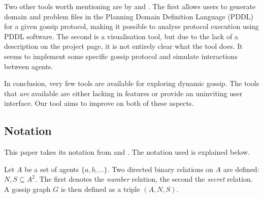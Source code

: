 Two other tools worth mentioning are by \textcite{maffre_faustinemaffregossipproblem-pddl-generator_2020} and \textcite{moelker_rrmoelkergossip-visualization_2016}.
The first allows users to generate domain and problem files in the Planning Domain Definition Language (PDDL) for a given gossip protocol, making it possible to analyse protocol execution using PDDL software.
The second is a visualisation tool, but due to the lack of a description on the project page, it is not entirely clear what the tool does. It seems to implement some specific gossip protocol and simulate interactions between agents.

In conclusion, very few tools are available for exploring dynamic gossip.
The tools that \emph{are} available are either lacking in features or provide an uninviting user interface.
Our tool aims to improve on both of these aspects.

\subsection{Notation}
\label{sec:notation}

This paper takes its notation from \Textcite{van_ditmarsch_dynamic_2018} and \Textcite{van_ditmarsch_strengthening_2019}.
The notation used is explained below.

\begin{definition}
    Let \(A\) be a set of agents \(\{a, b, \dots\}\).
    Two directed binary relations on \(A\) are defined: \(N, S \subseteq A^2\).
    The first denotes the \textit{number} relation, the second the \textit{secret} relation.
    A gossip graph \(G\) is then defined as a triple \((A, N, S)\).
\end{definition}

